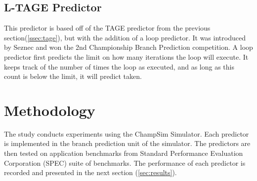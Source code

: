 \documentclass[conference]{IEEEtran}
\begin{document}
\subsection{L-TAGE Predictor} \label{ssec:ltage}
This predictor is based off of the TAGE predictor from the previous section(\ref{ssec:tage}), but with the addition of a loop predictor. It was introduced by Seznec and won the 2nd Championship Branch Prediction competition\cite{seznec2004}. A loop predictor first predicts the limit on how many iterations the loop will execute. It keeps track of the number of times the loop as executed, and as long as this count is below the limit, it will predict taken. 

\section{Methodology} \label{sec:methodology}
The study conducts experiments using the ChampSim Simulator. Each predictor is implemented in the branch prediction unit of the simulator. The predictors are then tested on application benchmarks from Standard Performance Evaluation Corporation (SPEC) suite of benchmarks. The performance of each predictor is recorded and presented in the next section (\ref{sec:results}).





\vspace{12pt}
\end{document}
